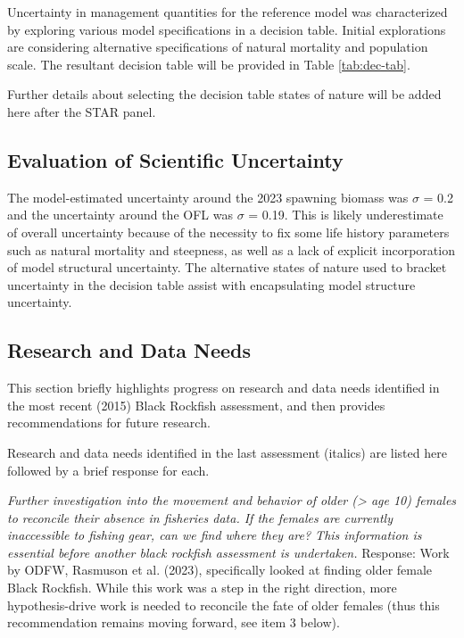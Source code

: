 \documentclass[11pt,
  english,
  letterpaper,
]{article}
\begin{document}
Uncertainty in management quantities for the reference model was characterized by exploring various model specifications in a decision table. Initial explorations are considering alternative specifications of natural mortality and population scale. The resultant decision table will be provided in Table \ref{tab:dec-tab}.

Further details about selecting the decision table states of nature will be added here after the STAR panel.

\hypertarget{evaluation-of-scientific-uncertainty}{%
\subsection{Evaluation of Scientific Uncertainty}\label{evaluation-of-scientific-uncertainty}}

The model-estimated uncertainty around the 2023 spawning biomass was \(\sigma\) = 0.2 and the uncertainty around the OFL was \(\sigma\) = 0.19. This is likely underestimate of overall uncertainty because of the necessity to fix some life history parameters such as natural mortality and steepness, as well as a lack of explicit incorporation of model structural uncertainty. The alternative states of nature used to bracket uncertainty in the decision table assist with encapsulating model structure uncertainty.

\hypertarget{research-and-data-needs-1}{%
\subsection{Research and Data Needs}\label{research-and-data-needs-1}}

This section briefly highlights progress on research and data needs identified in the most recent (2015) Black Rockfish assessment, and then provides recommendations for future research.

Research and data needs identified in the last assessment (italics) are listed here followed by a brief response for each.

\textit{Further investigation into the movement and behavior of older (> age 10) females to reconcile their absence in fisheries data. If the females are currently inaccessible to fishing gear, can we find where they are? This information is essential before another black rockfish assessment is undertaken.} Response: Work by ODFW, Rasmuson et al. (2023), specifically looked at finding older female Black Rockfish. While this work was a step in the right direction, more hypothesis-drive work is needed to reconcile the fate of older females (thus this recommendation remains moving forward, see item 3 below).
\end{document}
